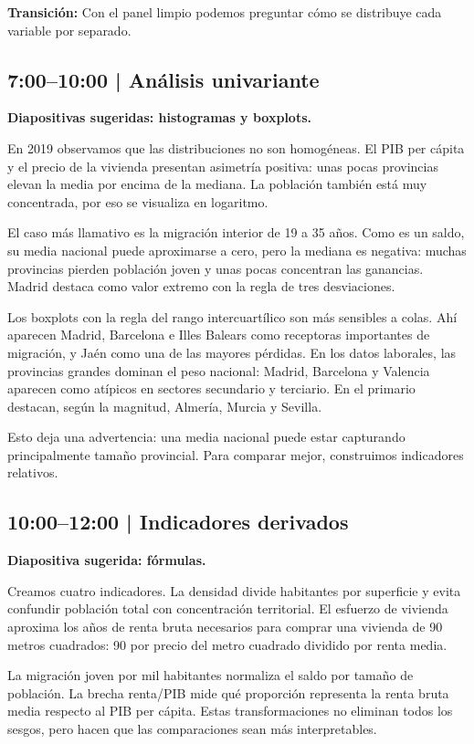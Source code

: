 \documentclass[11pt,a4paper]{article}
\begin{document}
\textbf{Transición:} Con el panel limpio podemos preguntar cómo se distribuye cada variable por separado.

\subsection{7:00--10:00 | Análisis univariante}
\textbf{Diapositivas sugeridas: histogramas y boxplots.}

En 2019 observamos que las distribuciones no son homogéneas. El PIB per cápita y el precio de la vivienda presentan asimetría positiva: unas pocas provincias elevan la media por encima de la mediana. La población también está muy concentrada, por eso se visualiza en logaritmo.

El caso más llamativo es la migración interior de 19 a 35 años. Como es un saldo, su media nacional puede aproximarse a cero, pero la mediana es negativa: muchas provincias pierden población joven y unas pocas concentran las ganancias. Madrid destaca como valor extremo con la regla de tres desviaciones.

Los boxplots con la regla del rango intercuartílico son más sensibles a colas. Ahí aparecen Madrid, Barcelona e Illes Balears como receptoras importantes de migración, y Jaén como una de las mayores pérdidas. En los datos laborales, las provincias grandes dominan el peso nacional: Madrid, Barcelona y Valencia aparecen como atípicos en sectores secundario y terciario. En el primario destacan, según la magnitud, Almería, Murcia y Sevilla.

Esto deja una advertencia: una media nacional puede estar capturando principalmente tamaño provincial. Para comparar mejor, construimos indicadores relativos.

\subsection{10:00--12:00 | Indicadores derivados}
\textbf{Diapositiva sugerida: fórmulas.}

Creamos cuatro indicadores. La densidad divide habitantes por superficie y evita confundir población total con concentración territorial. El esfuerzo de vivienda aproxima los años de renta bruta necesarios para comprar una vivienda de 90 metros cuadrados: 90 por precio del metro cuadrado dividido por renta media.

La migración joven por mil habitantes normaliza el saldo por tamaño de población. La brecha renta/PIB mide qué proporción representa la renta bruta media respecto al PIB per cápita. Estas transformaciones no eliminan todos los sesgos, pero hacen que las comparaciones sean más interpretables.
\end{document}
